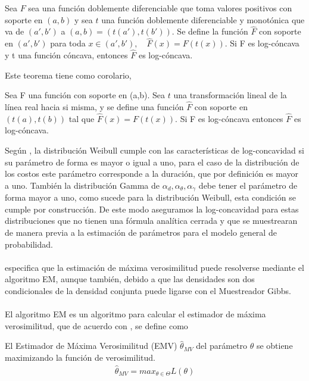 \begin{teo}
Sea $F$ sea una funci\'on doblemente diferenciable que toma valores positivos con soporte en $(a,b)$ y sea $t$ una funci\'on doblemente diferenciable y monot\'onica que va de $(a',b')$ a $(a,b)=(t(a'),t(b'))$. Se define la funci\'on $\hat{F}$ con soporte en $(a',b')$ para toda $x \in (a',b'), \quad \hat{F}(x)=F(t(x))$. Si F es log-c\'oncava y t una funci\'on c\'oncava, entonces $\hat{F}$ es log-c\'oncava.
\end{teo}
Este teorema tiene como corolario,
\begin{cor}
Sea F una funci\'on con soporte en (a,b). Sea $t$ una transformaci\'on lineal de la l\'inea real hacia si misma, y se define una funci\'on $\hat{F}$ con soporte en $(t(a),t(b))$ tal que $\hat{F}(x)=F(t(x))$. Si F es log-c\'oncava entonces $\hat{F}$ es log-c\'oncava. 
\end{cor}
Seg\'un \cite{bagnoli2005log}, la distribuci\'on Weibull cumple con las caracter\'isticas de log-concavidad si su par\'ametro de forma es mayor o igual a uno, para el caso de la distribuci\'on de los costos este par\'ametro corresponde a la duraci\'on, que por definici\'on es mayor a uno. Tambi\'en la distribuci\'on Gamma de $\alpha_d,\alpha_\theta, \alpha_\gamma$ debe tener el par\'ametro de forma mayor a uno, como sucede para la distribuci\'on Weibull, esta condici\'on se cumple por construcci\'on. De este modo aseguramos la log-concavidad para estas distribuciones que no tienen una f\'ormula anal\'itica cerrada y que se muestrearan de manera previa a la estimaci\'on de par\'ametros para el modelo general de probabilidad.\\
\\
\cite{pitt2002constructing} especifica que la estimaci\'on de m\'axima verosimilitud puede resolverse mediante el algoritmo EM, aunque tambi\'en, debido a que las densidades son dos condicionales de la densidad conjunta puede ligarse con el Muestreador Gibbs.\\
\\
El algoritmo EM es un algoritmo para calcular el estimador de m\'axima verosimilitud, que de acuerdo con \cite{held2014applied}, se define como
\begin{defi}
El Estimador de M\'axima Verosimilitud (EMV) $\hat{\theta}_{MV}$ del par\'ametro $\theta$ se obtiene maximizando la funci\'on de verosimilitud.
\begin{align*}
\hat{\theta}_{MV}=max_{\theta \in \Theta} L(\theta)
\end{align*} 
\end{defi}

